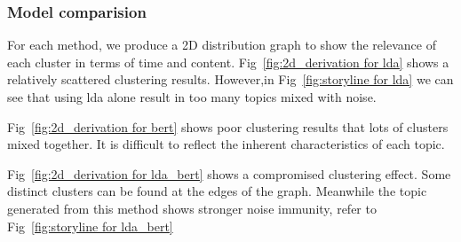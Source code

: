 \subsubsection{Model comparision}
For each method, we produce a 2D distribution graph to show the relevance of each cluster in terms of time and content. Fig~\ref{fig:2d_derivation for lda} shows a relatively scattered clustering results. However,in Fig~\ref{fig:storyline for lda} we can see that using lda alone result in too many topics mixed with noise. 

Fig~\ref{fig:2d_derivation for bert} shows poor clustering results that lots of clusters mixed together. It is difficult to reflect the inherent characteristics of each topic.

Fig~\ref{fig:2d_derivation for lda_bert} shows a compromised clustering effect. Some distinct clusters can be found at the edges of the graph. Meanwhile the topic generated from this method shows stronger noise immunity, refer to Fig~\ref{fig:storyline for lda_bert}


